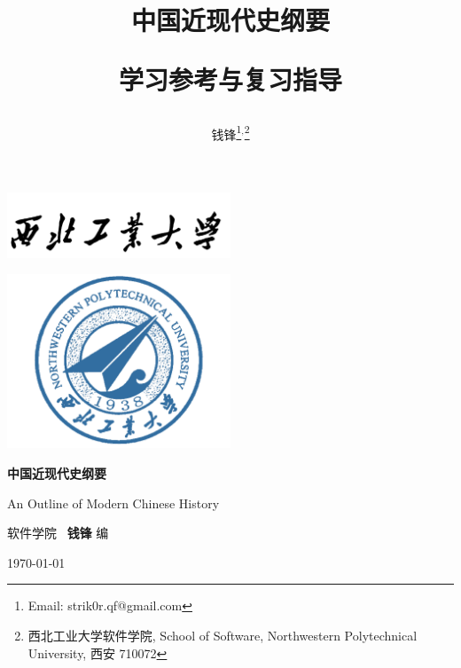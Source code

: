 \documentclass[10pt, UTF8]{book} %
\title{\textbf{中国近现代史纲要}

学习参考与复习指导}
\author{钱锋\thanks{Email: strik0r.qf@gmail.com}${}^,$\thanks{
    西北工业大学软件学院, School of Software, Northwestern Polytechnical University, 西安 710072
}}
\begin{document}

\pagestyle{empty}
\begin{titlepage}
    \thispagestyle{empty}
    \centering
        \vspace*{2cm}
        \includegraphics[width=0.5\textwidth]{pic/npu_2.png}\par
        \vspace{1em}
        \includegraphics[width=0.5\textwidth]{pic/npu_1.png}\par
    \vspace{1em}
        \begin{center}
            \Huge \heiti \textbf{中国近现代史纲要}

            An Outline of Modern Chinese History
        \end{center}
        \vspace{17em}
        \begin{center}
        \songti
        \kaishu 软件学院 \, \heiti\textbf{钱锋} \quad \songti 编
        \vspace{0.5em}

    \today
    \end{center}
\end{titlepage}
\cleardoublepage
\maketitle
\cleardoublepage

\frontmatter
\newpage
\pagestyle{plain}
\makeatother

\pagestyle{plain}
\tableofcontents
\newpage
\thispagestyle{empty}
\cleardoublepage %
\end{document}
